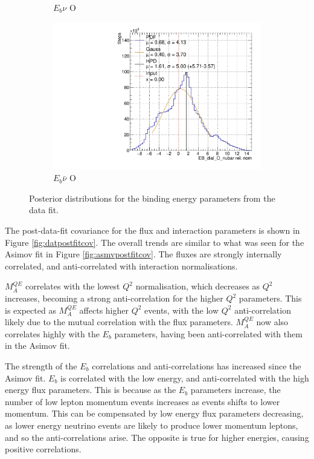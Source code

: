 \begin{figure}
\begin{subfigure}{.48\textwidth}
  \caption{$E_{b}\nu$ O}
\end{subfigure}
\begin{subfigure}{.48\textwidth}
  \centering
  \includegraphics[width=0.73\linewidth]{figs/EB_dial_O_nubarData}
  \caption{$E_{b}\bar{\nu}$ O}
\end{subfigure}
\caption{Posterior distributions for the binding energy parameters from the data fit.}
\label{fig:Ebdatares}
\end{figure}

The post-data-fit covariance for the flux and interaction parameters is shown in Figure \ref{fig:datpostfitcov}. The overall trends are similar to what was seen for the Asimov fit in Figure \ref{fig:asmvpostfitcov}. The fluxes are strongly internally correlated, and anti-correlated with interaction normalisations. 

$M^{QE}_A$ correlates with the lowest $Q^2$ normalisation, which decreases as $Q^2$ increases, becoming a strong anti-correlation for the higher $Q^2$ parameters. This is expected as $M^{QE}_A$ affects higher $Q^2$ events, with the low $Q^2$ anti-correlation likely due to the mutual correlation with the flux parameters. $M^{QE}_A$ now also correlates highly with the $E_b$ parameters, having been anti-correlated with them in the Asimov fit.

The strength of the $E_b$ correlations and anti-correlations has increased since the Asimov fit. $E_b$ is correlated with the low energy, and anti-correlated with the high energy flux parameters. This is because as the $E_b$ parameters increase, the number of low lepton momentum events increases as events shifts to lower momentum. This can be compensated by low energy flux parameters decreasing, as lower energy neutrino events are likely to produce lower momentum leptons, and so the anti-correlations arise. The opposite is true for higher energies, causing positive correlations.

